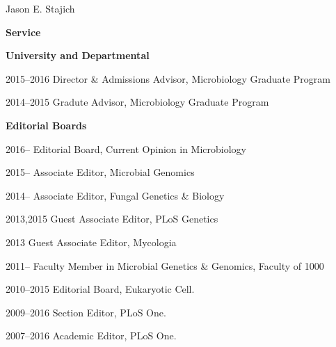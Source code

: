 \documentclass[10pt]{article}
\begin{document}
\begin{cv}{\centerline{Jason E. Stajich}}

\setlength{\cvlabelwidth}{18mm}

\begin{cvlistcompact}{\bf Service}
\item[{\bf University and Departmental}]
\item [2015--2016] Director \& Admissions Advisor, Microbiology Graduate Program
\item [2014--2015] Gradute Advisor, Microbiology Graduate Program
  \\  
\item[{\bf Editorial Boards}]
\item [2016--] Editorial Board, Current Opinion in Microbiology
\item [2015--] Associate Editor, Microbial Genomics
\item [2014--] Associate Editor, Fungal Genetics \& Biology
\item [2013,2015] Guest Associate Editor, PLoS Genetics
\item [2013] Guest Associate Editor, Mycologia
\item [2011--] Faculty Member in Microbial Genetics \& Genomics,
  Faculty of 1000
\item [2010--2015] Editorial Board, Eukaryotic Cell.
\item [2009--2016] Section Editor, PLoS One.
\item [2007--2016] Academic Editor, PLoS One.
\\
  

\end{cvlistcompact}
\end{cv}
\end{document}
